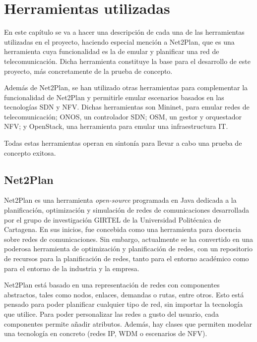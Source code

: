 \chapter{Herramientas utilizadas}
\label{herramientas}

En este capítulo se va a hacer una descripción de cada una de las herramientas utilizadas en el proyecto, haciendo especial mención a Net2Plan, que es una herramienta cuya funcionalidad es la de emular y planificar una red de telecomunicación. Dicha herramienta constituye la base para el desarrollo de este proyecto, más concretamente de la prueba de concepto.

Además de Net2Plan, se han utilizado otras herramientas para complementar la funcionalidad de Net2Plan y permitirle emular escenarios basados en las tecnologías \ac{SDN} y \ac{NFV}. Dichas herramientas son Mininet, para emular redes de telecomunicación; ONOS, un controlador \ac{SDN}; \ac{OSM}, un gestor y orquestador \ac{NFV}; y OpenStack, una herramienta para emular una infraestructura IT.

Todas estas herramientas operan en sintonía para llevar a cabo una prueba de concepto exitosa.


\section{Net2Plan}
\label{sec:net2plan}

Net2Plan\cite{net2planbib} es una herramienta \textit{open-source} programada en Java dedicada a la planificación, optimización y simulación de redes de comunicaciones desarrollada por el grupo de investigación GIRTEL de la Universidad Politécnica de Cartagena. En sus inicios, fue concebida como una herramienta para docencia sobre redes de comunicaciones. Sin embargo, actualmente se ha convertido en una poderosa herramienta de optimización y planificación de redes, con un repositorio de recursos para la planificación de redes, tanto para el entorno académico como para el entorno de la industria y la empresa.

Net2Plan está basado en una representación de redes con componentes abstractos, tales como nodos, enlaces, demandas o rutas, entre otros. Esto está pensado para poder planificar cualquier tipo de red, sin importar la tecnología que utilice. Para poder personalizar las redes a gusto del usuario, cada componentes permite añadir atributos. Además, hay clases que permiten modelar una tecnología en concreto (redes \ac{IP}, \ac{WDM} o escenarios de \ac{NFV}).

